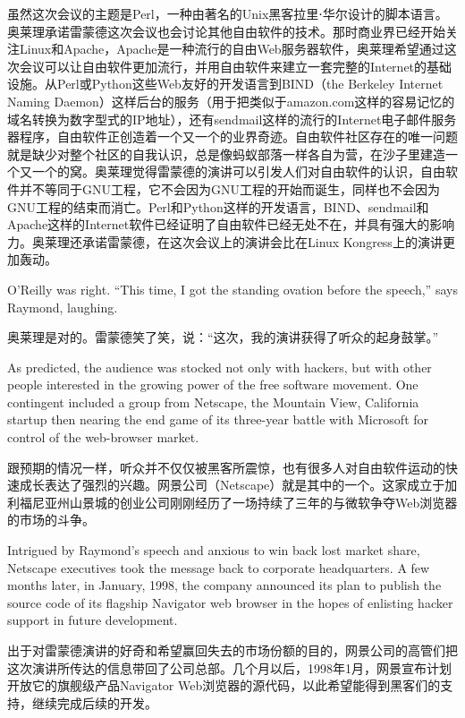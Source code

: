 \ifdefined\chs
虽然这次会议的主题是Perl，一种由著名的Unix黑客拉里⋅华尔设计的脚本语言。奥莱理承诺雷蒙德这次会议也会讨论其他自由软件的技术。那时商业界已经开始关注Linux和Apache，Apache是一种流行的自由Web服务器软件，奥莱理希望通过这次会议可以让自由软件更加流行，并用自由软件来建立一套完整的Internet的基础设施。从Perl或Python这些Web友好的开发语言到BIND（the Berkeley Internet Naming Daemon）这样后台的服务（用于把类似于amazon.com这样的容易记忆的域名转换为数字型式的IP地址），还有sendmail这样的流行的Internet电子邮件服务器程序，自由软件正创造着一个又一个的业界奇迹。自由软件社区存在的唯一问题就是缺少对整个社区的自我认识，总是像蚂蚁部落一样各自为营，在沙子里建造一个又一个的窝。奥莱理觉得雷蒙德的演讲可以引发人们对自由软件的认识，自由软件并不等同于GNU工程，它不会因为GNU工程的开始而诞生，同样也不会因为GNU工程的结束而消亡。Perl和Python这样的开发语言，BIND、sendmail和Apache这样的Internet软件已经证明了自由软件已经无处不在，并具有强大的影响力。奥莱理还承诺雷蒙德，在这次会议上的演讲会比在Linux Kongress上的演讲更加轰动。
\fi

\ifdefined\eng
O'Reilly was right. ``This time, I got the standing ovation before the speech,'' says Raymond, laughing.
\fi

\ifdefined\chs
奥莱理是对的。雷蒙德笑了笑，说：``这次，我的演讲获得了听众的起身鼓掌。''
\fi

\ifdefined\eng
As predicted, the audience was stocked not only with hackers, but with other people interested in the growing power of the free software movement. One contingent included a group from Netscape, the Mountain View, California startup then nearing the end game of its three-year battle with Microsoft for control of the web-browser market.
\fi

\ifdefined\chs
跟预期的情况一样，听众并不仅仅被黑客所震惊，也有很多人对自由软件运动的快速成长表达了强烈的兴趣。网景公司（Netscape）就是其中的一个。这家成立于加利福尼亚州山景城的创业公司刚刚经历了一场持续了三年的与微软争夺Web浏览器的市场的斗争。
\fi

\ifdefined\eng
Intrigued by Raymond's speech and anxious to win back lost market share, Netscape executives took the message back to corporate headquarters. A few months later, in January, 1998, the company announced its plan to publish the source code of its flagship Navigator web browser in the hopes of enlisting hacker support in future development.
\fi

\ifdefined\chs
出于对雷蒙德演讲的好奇和希望赢回失去的市场份额的目的，网景公司的高管们把这次演讲所传达的信息带回了公司总部。几个月以后，1998年1月，网景宣布计划开放它的旗舰级产品Navigator Web浏览器的源代码，以此希望能得到黑客们的支持，继续完成后续的开发。
\fi


